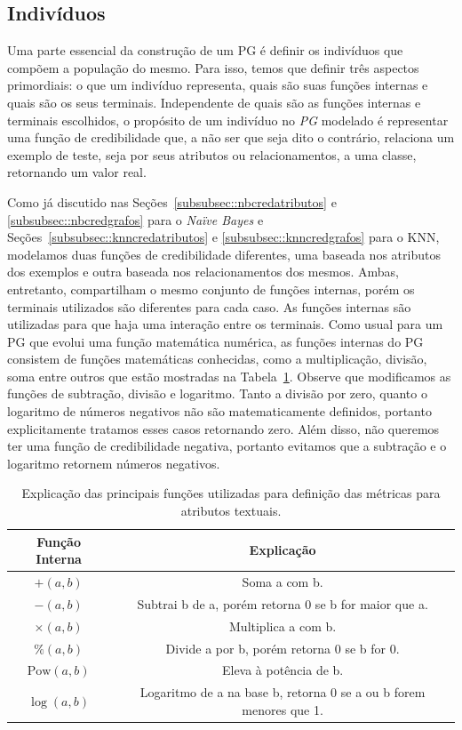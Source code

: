 \subsection{Indivíduos}
\label{subsec::individuos}

Uma parte essencial da construção de um \textsc{PG} é definir os indivíduos que compõem a população do mesmo.
Para isso, temos que definir três aspectos primordiais: o que um indivíduo representa, quais são suas funções internas e quais são os seus terminais. Independente de quais são as funções internas e terminais escolhidos, o propósito de um indivíduo no \textit{PG} modelado é representar uma função de credibilidade que, a não ser que seja dito o contrário, relaciona um exemplo de teste, seja por seus atributos ou relacionamentos, a uma classe, retornando um valor real. 

Como já discutido nas Seções~\ref{subsubsec::nbcredatributos} e \ref{subsubsec::nbcredgrafos} para o \textit{Naïve Bayes} e Seções~\ref{subsubsec::knncredatributos} e \ref{subsubsec::knncredgrafos} para o \textsc{KNN}, modelamos duas funções de credibilidade diferentes, uma baseada nos atributos dos exemplos e outra baseada nos relacionamentos dos mesmos.
Ambas, entretanto, compartilham o mesmo conjunto de funções internas, porém os terminais utilizados são diferentes para cada caso. As funções internas são utilizadas para que haja uma interação entre os terminais.
Como usual para um \textsc{PG} que evolui uma função matemática numérica, as funções internas do \textsc{PG} consistem de funções matemáticas conhecidas, como a multiplicação, divisão, soma entre outros que estão mostradas na Tabela~\ref{table::funcoespg}. 
Observe que modificamos as funções de subtração, divisão e logaritmo.
Tanto a divisão por zero, quanto o logaritmo de números negativos não são matematicamente definidos, portanto explicitamente tratamos esses casos retornando zero. Além disso, não queremos ter uma função de credibilidade negativa, portanto evitamos que a subtração e o logaritmo retornem números negativos.

\begin{table}[ht*]
\centering
\begin{tabular}{|c|c|}
\toprule
    \textbf{Função Interna} & \textbf{Explicação} \\
\midrule
    $+(a,b)$           & Soma a com b. \tabularnewline \hline
    $-(a,b)$           & Subtrai b de a, porém retorna 0 se b for maior que a.\tabularnewline \hline
    $\times(a,b) $     & Multiplica a com b. \tabularnewline \hline
    $\%(a,b)$          & Divide a por b, porém retorna 0 se b for 0. \tabularnewline \hline
    $\text{Pow}(a,b)$  & Eleva à potência de b. \tabularnewline \hline 
    $\log(a,b) $       & Logaritmo de a na base b, retorna 0 se a ou b forem menores que 1. \tabularnewline
\bottomrule
\end{tabular}
\caption{Explicação das principais funções utilizadas para definição das métricas para atributos textuais.}
\label{table::funcoespg}
\end{table}

